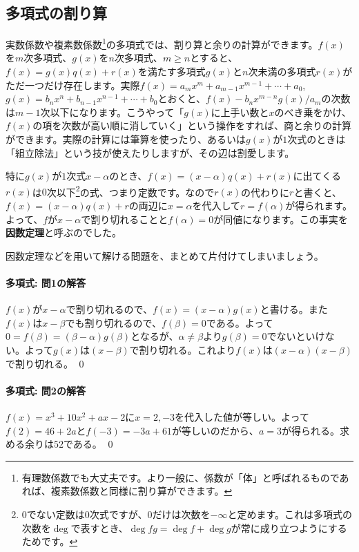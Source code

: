 \subsection{多項式の割り算}

実数係数や複素数係数\footnote{有理数係数でも大丈夫です。より一般に、係数が「体」と呼ばれるものであれば、複素数係数と同様に割り算ができます。}の多項式では、割り算と余りの計算ができます。$f(x)$を$m$次多項式、$g(x)$を$n$次多項式、$m\geq n$とすると、$f(x)=g(x)q(x)+r(x)$を満たす多項式$g(x)$と$n$次未満の多項式$r(x)$がただ一つだけ存在します。実際$f(x) = a_m x^m + a_{m-1}x^{m-1} + \cdots + a_0$, $g(x) = b_n x^n + b_{n-1} x^{n-1} +\cdots + b_0$とおくと、$f(x) - b_n x^{m-n} g(x) / a_m$の次数は$m-1$次以下になります。こうやって「$g(x)$に上手い数と$x$のべき乗をかけ、$f(x)$の項を次数が高い順に消していく」という操作をすれば、商と余りの計算ができます。実際の計算には筆算を使ったり、あるいは$g(x)$が$1$次式のときは「組立除法」という技が使えたりしますが、その辺は割愛します。

特に$g(x)$が$1$次式$x-\alpha$のとき、$f(x)=(x-\alpha)q(x)+r(x)$に出てくる$r(x)$は$0$次以下\footnote{$0$でない定数は$0$次式ですが、$0$だけは次数を$-\infty$と定めます。これは多項式の次数を$\deg$で表すとき、$\deg fg=\deg f + \deg g$が常に成り立つようにするためです。}の式、つまり定数です。なので$r(x)$の代わりに$r$と書くと、$f(x)=(x-\alpha)q(x)+r$の両辺に$x=\alpha$を代入して$r=f(\alpha)$が得られます。よって、$f$が$x-\alpha$で割り切れることと$f(\alpha)=0$が同値になります。この事実を\textbf{因数定理}と呼ぶのでした。

因数定理などを用いて解ける問題を、まとめて片付けてしまいましょう。


\paragraph{多項式: 問1の解答}
$f(x)$が$x-\alpha$で割り切れるので、$f(x)=(x-\alpha)g(x)$と書ける。また$f(x)$は$x-\beta$でも割り切れるので、$f(\beta)=0$である。よって$0=f(\beta)=(\beta-\alpha)g(\beta)$となるが、$\alpha\neq\beta$より$g(\beta)=0$でないといけない。よって$g(x)$は$(x-\beta)$で割り切れる。これより$f(x)$は$(x-\alpha)(x-\beta)$で割り切れる。 \qed

\paragraph{多項式: 問2の解答}
$f(x)=x^3+10x^2+ax-2$に$x=2,-3$を代入した値が等しい。よって$f(2)=46+2a$と$f(-3)=-3a+61$が等しいのだから、$a=3$が得られる。求める余りは$52$である。 \qed

